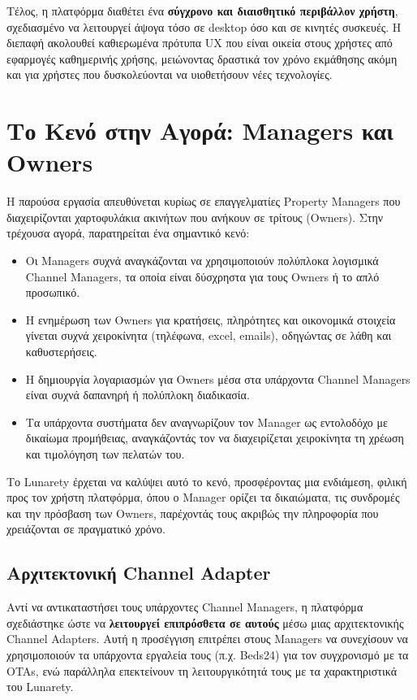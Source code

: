 \documentclass[
	12pt, %
	oneside, %
	greek,
	onehalfspacing, %
	liststotoc, %
	toctotoc, %
	parskip, %
	headsepline, %
]{MastersDoctoralThesis} %
\begin{document}
Τέλος, η πλατφόρμα διαθέτει ένα \textbf{σύγχρονο και διαισθητικό περιβάλλον χρήστη}, σχεδιασμένο να λειτουργεί άψογα τόσο σε desktop όσο και σε κινητές συσκευές. Η διεπαφή ακολουθεί καθιερωμένα πρότυπα UX που είναι οικεία στους χρήστες από εφαρμογές καθημερινής χρήσης, μειώνοντας δραστικά τον χρόνο εκμάθησης ακόμη και για χρήστες που δυσκολεύονται να υιοθετήσουν νέες τεχνολογίες.

\section{Το Κενό στην Αγορά: Managers και Owners}
\label{sec:market-gap}

Η παρούσα εργασία απευθύνεται κυρίως σε επαγγελματίες Property Managers που διαχειρίζονται χαρτοφυλάκια ακινήτων που ανήκουν σε τρίτους (Owners). Στην τρέχουσα αγορά, παρατηρείται ένα σημαντικό κενό:

\begin{itemize}
    \item Οι Managers συχνά αναγκάζονται να χρησιμοποιούν πολύπλοκα λογισμικά Channel Managers, τα οποία είναι δύσχρηστα για τους Owners ή το απλό προσωπικό.
    \item Η ενημέρωση των Owners για κρατήσεις, πληρότητες και οικονομικά στοιχεία γίνεται συχνά χειροκίνητα (τηλέφωνα, excel, emails), οδηγώντας σε λάθη και καθυστερήσεις.
    \item Η δημιουργία λογαριασμών για Owners μέσα στα υπάρχοντα Channel Managers είναι συχνά δαπανηρή ή πολύπλοκη διαδικασία.
    \item Τα υπάρχοντα συστήματα δεν αναγνωρίζουν τον Manager ως εντολοδόχο με δικαίωμα προμήθειας, αναγκάζοντάς τον να διαχειρίζεται χειροκίνητα τη χρέωση και τιμολόγηση των πελατών του.
\end{itemize}

Το Lunarety έρχεται να καλύψει αυτό το κενό, προσφέροντας μια ενδιάμεση, φιλική προς τον χρήστη πλατφόρμα, όπου ο Manager ορίζει τα δικαιώματα, τις συνδρομές και την πρόσβαση των Owners, παρέχοντάς τους ακριβώς την πληροφορία που χρειάζονται σε πραγματικό χρόνο.

\subsection{Αρχιτεκτονική Channel Adapter}
\label{subsec:channel-adapter}

Αντί να αντικαταστήσει τους υπάρχοντες Channel Managers, η πλατφόρμα σχεδιάστηκε ώστε να \textbf{λειτουργεί επιπρόσθετα σε αυτούς} μέσω μιας αρχιτεκτονικής Channel Adapters. Αυτή η προσέγγιση επιτρέπει στους Managers να συνεχίσουν να χρησιμοποιούν τα υπάρχοντα εργαλεία τους (π.χ. Beds24) για τον συγχρονισμό με τα OTAs, ενώ παράλληλα επεκτείνουν τη λειτουργικότητά τους με τα χαρακτηριστικά του Lunarety.
\end{document}
